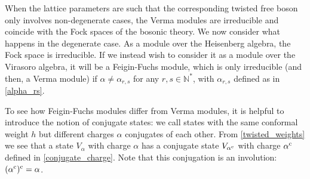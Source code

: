 \documentclass[a4paper,10pt]{article}
\newcommand{\q}{\mathfrak{q}}
\begin{document}

When the lattice parameters are such that the corresponding twisted free boson only involves non-degenerate cases,
the Verma modules are irreducible and coincide with the Fock spaces of the bosonic theory. We now consider what happens in the degenerate case.
As a module over the Heisenberg algebra, the Fock space is irreducible. If we instead wish to consider it as a module over the Virasoro algebra, it will be a Feigin-Fuchs module, which is only irreducible (and then, a Verma module) if $\alpha \neq \alpha_{r,s}$ for any $r,s\in\mathbb{N}^*$, with $\alpha_{r,s}$ defined as in \eqref{alpha_rs}.

To see how Feigin-Fuchs modules differ from Verma modules, it is helpful to introduce the notion of conjugate states: we call states with the same conformal weight $h$ but different charges $\alpha$ conjugates of each other. From \eqref{twisted_weights} we see that a state $V_\alpha$ with charge $\alpha$ has a conjugate state $V_{\alpha^{\rm c}}$  with charge $\alpha^{\rm c} $ defined in \eqref{conjugate_charge}. Note that this conjugation is an involution: $(\alpha^{\rm c})^{\rm c}=\alpha$.
\end{document}
